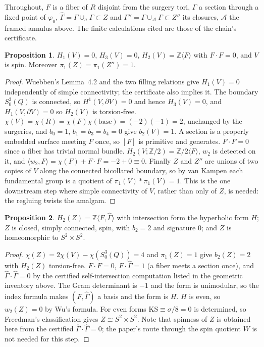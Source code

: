 \documentclass[11pt]{article}
\newcommand{\Z}{\mathbb{Z}}
\newcommand{\pione}{\pi_1}
\newcommand{\Zpp}{Z''}
\newcommand{\Ghat}{\widehat{\Gamma}}
\newcommand{\Gpp}{\Gamma''}
\theoremstyle{definition}
\newtheorem{proposition}{Proposition}[section]
\begin{document}
Throughout, $F$ is a fiber of $R$ disjoint from the surgery tori, $\Gamma$
a section through a fixed point of $\varphi_0$, $\Ghat=\Gamma\cup_\sigma
\Gamma\subset Z$ and $\Gpp=\Gamma\cup_{\mathcal A}\Gamma\subset\Zpp$ its
closures, $\mathcal A$ the framed annulus above.
The finite calculations cited are those of the chain's certificate.

\begin{proposition}\label{prop:V}
$H_1(V)=0$, $H_3(V)=0$, $H_2(V)=\Z\langle F\rangle$ with $F\cdot F=0$,
and $V$ is spin. Moreover $\pione(Z)=\pione(\Zpp)=1$.
\end{proposition}

\begin{proof}
Wuebben's Lemma~4.2 and the two filling relations give $H_1(V)=0$
independently of simple connectivity; the certificate also implies it. The
boundary $S^3_0(Q)$ is connected, so
$H^1(V,\partial V)=0$ and hence $H_3(V)=0$, and $H_1(V,\partial V)=0$ so
$H_2(V)$ is torsion-free. $\chi(V)=\chi(R)=\chi(F)\chi(\text{base})=
(-2)(-1)=2$, unchanged by the surgeries, and $b_0=1$, $b_1=b_3=b_4=0$
give $b_2(V)=1$. A section is a properly embedded surface meeting $F$
once, so $[F]$ is primitive and generates. $F\cdot F=0$ since a fiber has
trivial normal bundle. $H_2(V;\Z/2)=\Z/2\langle F\rangle$, $w_2$ is
detected on it, and $\langle w_2,F\rangle=\chi(F)+F\cdot F=-2+0\equiv0$.
Finally $Z$ and $\Zpp$ are unions of two copies of $V$ along the connected
bicollared boundary, so by van Kampen each fundamental group is a
quotient of $\pione(V)*\pione(V)=1$. This is the one downstream step where
simple connectivity of $V$, rather than only of $Z$, is needed: the
regluing twists the amalgam.
\end{proof}

\begin{proposition}\label{prop:Z}
$H_2(Z)=\Z\langle F,\Ghat\rangle$ with intersection form the hyperbolic
form $H$; $Z$ is closed, simply connected, spin, with $b_2=2$ and
signature $0$; and $Z$ is homeomorphic to $S^2\times S^2$.
\end{proposition}

\begin{proof}
$\chi(Z)=2\chi(V)-\chi(S^3_0(Q))=4$ and $\pione(Z)=1$ give $b_2(Z)=2$
with $H_2(Z)$ torsion-free. $F\cdot F=0$, $F\cdot\Ghat=1$ (a fiber meets
a section once), and $\Ghat\cdot\Ghat=0$ by the certified
self-intersection computation listed in the geometric inventory above.
The Gram
determinant is $-1$ and the form
is unimodular, so the index formula makes $(F,\Ghat)$ a basis and the
form is $H$. $H$ is even, so $w_2(Z)=0$ by Wu's formula. For even forms
$\mathrm{KS}\equiv\sigma/8=0$ is determined, so Freedman's classification
gives $Z\cong S^2\times S^2$. Note that spinness of $Z$ is obtained here
from the certified $\Ghat\cdot\Ghat=0$; the paper's route through the
spin quotient $W$ is not needed for this step.
\end{proof}
\end{document}
